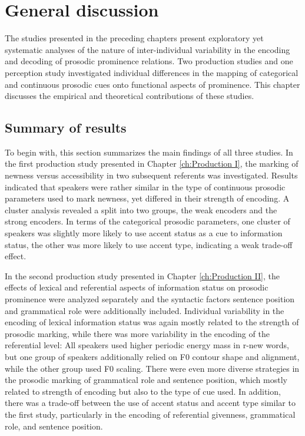\chapter{General discussion} \label{ch: general discussion}

The studies presented in the preceding chapters present exploratory yet systematic analyses of the nature of inter-individual variability in the encoding and decoding of prosodic prominence relations. Two production studies and one perception study investigated individual differences in the mapping of categorical and continuous prosodic cues onto functional aspects of prominence. This chapter discusses the empirical and theoretical contributions of these studies.

\section{Summary of results}

To begin with, this section summarizes the main findings of all three studies. In the first production study presented in Chapter \ref{ch:Production I}, the marking of newness versus accessibility in two subsequent referents was investigated. Results indicated that speakers were rather similar in the type of continuous prosodic parameters used to mark newness, yet differed in their strength of encoding. A cluster analysis revealed a split into two groups, the weak encoders and the strong encoders. In terms of the categorical prosodic parameters, one cluster of speakers was slightly more likely to use accent status as a cue to information status, the other was more likely to use accent type, indicating a weak trade-off effect.

In the second production study presented in Chapter \ref{ch:Production II}, the effects of lexical and referential aspects of information status on prosodic prominence were analyzed separately and the syntactic factors sentence position and grammatical role were additionally included. Individual variability in the encoding of lexical information status was again mostly related to the strength of prosodic marking, while there was more variability in the encoding of the referential level: All speakers used higher periodic energy mass in r-new words, but one group of speakers additionally relied on F0 contour shape and alignment, while the other group used F0 scaling. There were even more diverse strategies in the prosodic marking of grammatical role and sentence position, which mostly related to strength of encoding but also to the type of cue used. In addition, there was a trade-off between the use of accent status and accent type similar to the first study, particularly in the encoding of referential givenness, grammatical role, and sentence position. 

